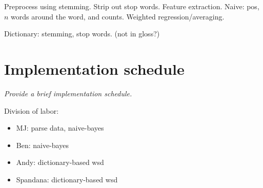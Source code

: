 \documentclass{article}
\begin{document}
Preprocess using stemming. Strip out stop words. Feature extraction. Naive: pos, $n$ words around the word, and counts. Weighted regression/averaging.

Dictionary: stemming, stop words. (not in gloss?)

\section{Implementation schedule}
\textit{Provide a brief implementation schedule.}\par

Division of labor:
\begin{itemize}
\item MJ: parse data, naive-bayes
\item Ben: naive-bayes
\item Andy: dictionary-based wsd
\item Spandana: dictionary-based wsd
\end{itemize}
\end{document}
